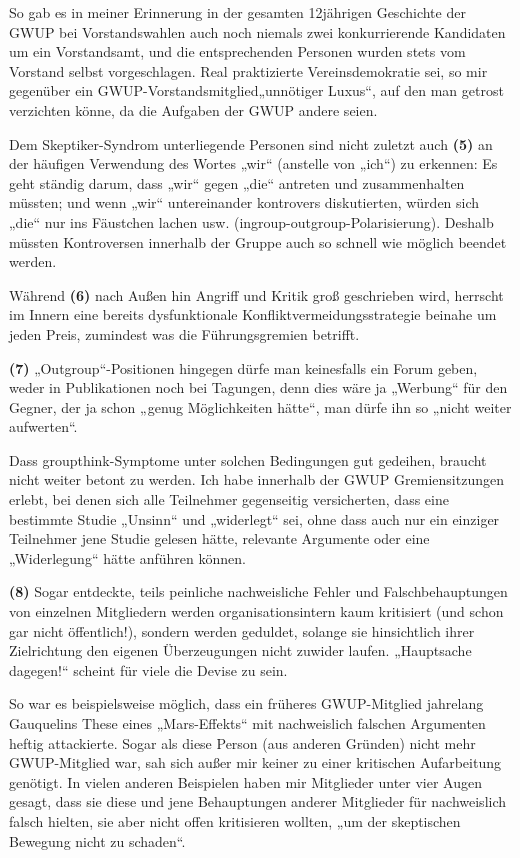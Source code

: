 So gab es in meiner Erinnerung in der gesamten 12jährigen Geschichte der
GWUP bei Vorstandswahlen auch noch niemals zwei konkurrierende
Kandidaten um ein Vorstandsamt, und die entsprechenden Personen wurden
stets vom Vorstand selbst vorgeschlagen. Real praktizierte
Vereinsdemokratie sei, so mir gegenüber ein
GWUP-Vorstandsmitglied„unnötiger Luxus``, auf den man getrost verzichten
könne, da die Aufgaben der GWUP andere seien.

Dem Skeptiker-Syndrom unterliegende Personen sind nicht zuletzt auch
\textbf{(5)} an der häufigen Verwendung des Wortes „wir`` (anstelle von
„ich``) zu erkennen: Es geht ständig darum, dass „wir`` gegen „die``
antreten und zusammenhalten müssten; und wenn „wir`` untereinander
kontrovers diskutierten, würden sich „die`` nur ins Fäustchen lachen
usw. (ingroup-outgroup-Polarisierung). Deshalb müssten Kontroversen
innerhalb der Gruppe auch so schnell wie möglich beendet werden.

Während \textbf{(6)} nach Außen hin Angriff und Kritik groß geschrieben
wird, herrscht im Innern eine bereits dysfunktionale
Konfliktvermeidungsstrategie beinahe um jeden Preis, zumindest was die
Führungsgremien betrifft.

\textbf{(7)} „Outgroup``-Positionen hingegen dürfe man keinesfalls ein
Forum geben, weder in Publikationen noch bei Tagungen, denn dies wäre ja
„Werbung`` für den Gegner, der ja schon „genug Möglichkeiten hätte``,
man dürfe ihn so „nicht weiter aufwerten``.

Dass groupthink-Symptome unter solchen Bedingungen gut gedeihen, braucht
nicht weiter betont zu werden. Ich habe innerhalb der GWUP
Gremiensitzungen erlebt, bei denen sich alle Teilnehmer gegenseitig
versicherten, dass eine bestimmte Studie „Unsinn`` und „widerlegt`` sei,
ohne dass auch nur ein einziger Teilnehmer jene Studie gelesen hätte,
relevante Argumente oder eine „Widerlegung`` hätte anführen können.

\textbf{(8)} Sogar entdeckte, teils peinliche nachweisliche Fehler und
Falschbehauptungen von einzelnen Mitgliedern werden organisationsintern
kaum kritisiert (und schon gar nicht öffentlich!), sondern werden
geduldet, solange sie hinsichtlich ihrer Zielrichtung den eigenen
Überzeugungen nicht zuwider laufen. „Hauptsache dagegen!`` scheint für
viele die Devise zu sein.

So war es beispielsweise möglich, dass ein früheres GWUP-Mitglied
jahrelang Gauquelins These eines „Mars-Effekts`` mit nachweislich
falschen Argumenten heftig attackierte. Sogar als diese Person (aus
anderen Gründen) nicht mehr GWUP-Mitglied war, sah sich außer mir keiner
zu einer kritischen Aufarbeitung genötigt. In vielen anderen Beispielen
haben mir Mitglieder unter vier Augen gesagt, dass sie diese und jene
Behauptungen anderer Mitglieder für nachweislich falsch hielten, sie
aber nicht offen kritisieren wollten, „um der skeptischen Bewegung nicht
zu schaden``.

